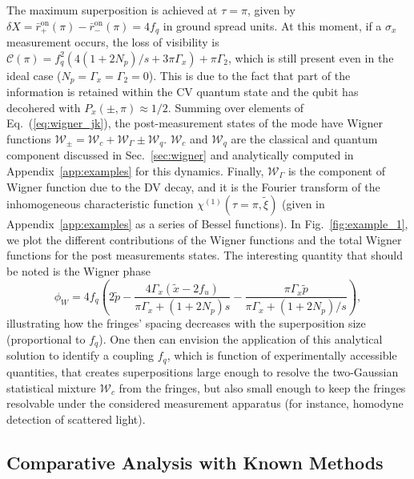 \documentclass[%
reprint,
superscriptaddress,
nofootinbib,
 amsmath,amssymb,
prx,
floatfix,
]{revtex4-2}
\begin{document}
The maximum superposition is achieved at $\tau = \pi$, given by $\delta X = \bar{r}^{\text{on}}_{+}(\pi) -  \bar{r}^{\text{on}}_{-}(\pi) = 4 f_q$ in ground spread units. At this moment, if a $\sigma_x$ measurement occurs, the loss of visibility is $ \mathcal{C} (\pi) = f_q^2 \left(4 (1 +2 N_p)/s + 3 \pi \Gamma_x \right) +  \pi \Gamma_2 $, which is still present even in the ideal case ($N_p = \Gamma_x = \Gamma_2 = 0$). This is due to the fact that part of the information is retained within the CV quantum state and the qubit has decohered with $P_x (\pm, \pi) \approx 1/2$.  Summing over elements of Eq.~(\ref{eq:wigner_jk}), the post-measurement states of the mode have Wigner functions $\mathcal{W}_{\pm} = \mathcal{W}_c +  \mathcal{W}_\Gamma \pm \mathcal{W}_q $. $\mathcal{W}_c$ and $\mathcal{W}_q$ are the classical and quantum component discussed in Sec.~\ref{sec:wigner} and analytically computed in Appendix~\ref{app:examples} for this dynamics.   Finally, $\mathcal{W}_\Gamma$ is the component of Wigner function due to the DV decay, and it is the Fourier transform of the inhomogeneous characteristic function $\chi^{(1)} (\tau = \pi, \tilde{\xi})$  (given in Appendix~\ref{app:examples} as a series of Bessel functions). In Fig.~\ref{fig:example_1}, we plot the different contributions of the Wigner functions and the total Wigner functions for the post measurements states.  The interesting quantity that should be noted is the Wigner phase
\begin{equation}
    \phi_W = 4 f_q \left(2 \tilde{p} - \frac{4 \Gamma_x  \left(\tilde{x}-2 f_u\right)}{\pi  \Gamma_x+  (1 +2 N_p)s}- \frac{\pi  \Gamma_x  \tilde{p} }{\pi  \Gamma_x + (1 + 2 N_p)/s }\right) \nonumber,
\end{equation}
illustrating how the fringes' spacing decreases with the superposition size (proportional to $f_q$). One then can envision the application of this analytical solution to identify a coupling $f_q$, which is function of experimentally accessible quantities, that creates superpositions large enough to resolve the two-Gaussian statistical mixture $\mathcal{W}_c$ from the fringes, but also small enough to keep the fringes resolvable under the considered measurement apparatus (for instance, homodyne detection of scattered light).


\subsection{Comparative Analysis with Known Methods}
\end{document}

